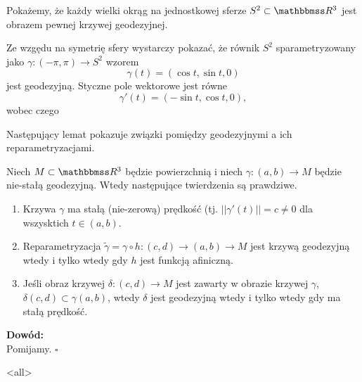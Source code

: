 \begin{frame}
Pokażemy, że każdy wielki okrąg na jednostkowej sferze $S^2\subset \R^3$ jest obrazem pewnej krzywej geodezyjnej. 

Ze wzgędu na symetrię sfery wystarczy pokazać, że równik $S^2$ sparametryzowany jako $\gamma\colon (-\pi,\pi)\to S^2$ wzorem \[\gamma(t)=(\cos t,\sin t,0)\] jest geodezyjną. \pause Styczne pole wektorowe jest równe \[\gamma'(t)=(-\sin t, \cos t, 0),\] wobec czego
\end{frame}

Następujący lemat pokazuje związki pomiędzy geodezyjnymi a ich reparametryzacjami.
\begin{frame}
\begin{lemat}\label{lem:param-of-geodesics}
Niech $M\subset \R^3$ będzie powierzchnią i niech $\gamma\colon(a,b)\to M$ będzie nie-stałą geodezyjną. Wtedy następujące twierdzenia są prawdziwe.
\begin{enumerate}
\item Krzywa $\gamma$ ma stałą (nie-zerową) prędkość (tj. $||\gamma'(t)||=c\neq 0$ dla wszysktich $t\in(a,b)$.
\pause\item Reparametryzacja $\widetilde{\gamma}=\gamma\circ h\colon (c,d)\to (a,b)\to M$ jest krzywą geodezyjną wtedy i tylko wtedy gdy $h$ jest funkcją afiniczną.
\pause\item Jeśli obraz krzywej $\delta\colon (c,d)\to M$ jest zawarty w obrazie krzywej $\gamma$, $\delta(c,d)\subset \gamma(a,b)$, wtedy $\delta$ jest geodezyjną wtedy i tylko wtedy gdy ma stałą prędkość.
\end{enumerate}
\end{lemat}

\pause \textcolor{ared}{\textbf{Dowód:}}\\
Pomijamy.
\hfill $\square$

\end{frame}

\mode<all> 
